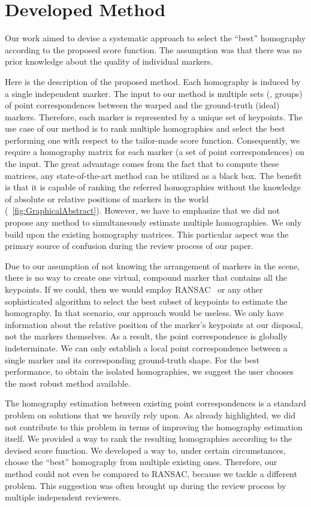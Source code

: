 \section{Developed Method}
\label{sec:HomographyDevelopedMethod}

Our work aimed to devise a systematic approach to select the ``best'' homography according to the proposed score function. The assumption was that there was no prior knowledge about the quality of individual markers.

Here is the description of the proposed method. Each homography is induced by a single independent marker. The input to our method is multiple sets (\ietext{}, groups) of point correspondences between the warped and the ground-truth (ideal) markers. Therefore, each marker is represented by a unique set of keypoints. The use case of our method is to rank multiple homographies and select the best performing one with respect to the tailor-made score function. Consequently, we require a homography matrix for each marker (a set of point correspondences) on the input. The great advantage comes from the fact that to compute these matrices, any state-of-the-art method can be utilized as a black box. The benefit is that it is capable of ranking the referred homographies without the knowledge of absolute or relative positions of markers in the world (\figtext{}~\ref{fig:GraphicalAbstract}). However, we have to emphasize that we did not propose any method to simultaneously estimate multiple homographies. We only build upon the existing homography matrices. This particular aspect was the primary source of confusion during the review process of our paper.

Due to our assumption of not knowing the arrangement of markers in the scene, there is no way to create one virtual, compound marker that contains all the keypoints. If we could, then we would employ RANSAC~\cite{fischler1981ransac} or any other sophisticated algorithm to select the best subset of keypoints to estimate the homography. In that scenario, our approach would be useless. We only have information about the relative position of the marker’s keypoints at our disposal, not the markers themselves. As a result, the point correspondence is globally indeterminate. We can only establish a local point correspondence between a single marker and its corresponding ground-truth shape. For the best performance, to obtain the isolated homographies, we suggest the user chooses the most robust method available.

The homography estimation between existing point correspondences is a standard problem on solutions that we heavily rely upon. As already highlighted, we did not contribute to this problem in terms of improving the homography estimation itself. We provided a way to rank the resulting homographies according to the devised score function. We developed a way to,
under certain circumstances, choose the ``best'' homography from multiple existing ones. Therefore, our method could not even be compared to RANSAC, because we tackle a different problem. This suggestion was often brought up during the review process by multiple independent reviewers.

